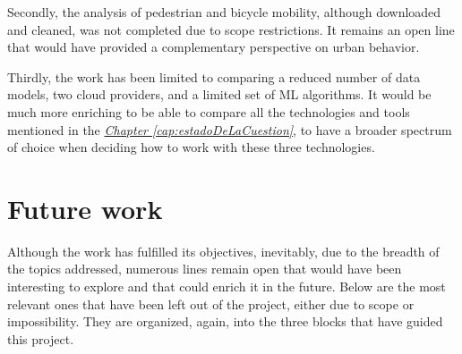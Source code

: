 Secondly, the analysis of pedestrian and bicycle mobility, although downloaded and cleaned, was not completed due to scope restrictions. It remains an open line that would have provided a complementary perspective on urban behavior.

Thirdly, the work has been limited to comparing a reduced number of data models, two cloud providers, and a limited set of ML algorithms. It would be much more enriching to be able to compare all the technologies and tools mentioned in the \hyperref[cap:estadoDeLaCuestion]{\textit{Chapter \ref*{cap:estadoDeLaCuestion}}}, to have a broader spectrum of choice when deciding how to work with these three technologies.

\section*{Future work}

Although the work has fulfilled its objectives, inevitably, due to the breadth of the topics addressed, numerous lines remain open that would have been interesting to explore and that could enrich it in the future. Below are the most relevant ones that have been left out of the project, either due to scope or impossibility. They are organized, again, into the three blocks that have guided this project.


